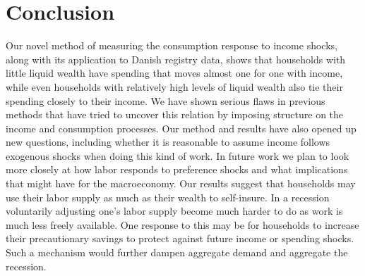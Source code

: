 \documentclass[titlepage]{\econtex}\newcommand{\texname}{IncomeUncertainty}
\begin{document}
\section{Conclusion}
Our novel method of measuring the consumption response to income shocks, along with its application to Danish registry data, shows that households with little liquid wealth have spending that moves almost one for one with income, while even households with relatively high levels of liquid wealth also tie their spending closely to their income. We have shown serious flaws in previous methods that have tried to uncover this relation by imposing structure on the income and consumption processes. Our method and results have also opened up new questions, including whether it is reasonable to assume income follows exogenous shocks when doing this kind of work. In future work we plan to look more closely at how labor responds to preference shocks and what implications that might have for the macroeconomy. Our results suggest that households may use their labor supply as much as their wealth to self-insure. In a recession voluntarily adjusting one's labor supply become much harder to do as work is much less freely available. One response to this may be for households to increase their precautionary savings to protect against future income or spending shocks. Such a mechanism would further dampen aggregate demand and aggregate the recession.


\processdelayedfloats

\small

\normalsize
\end{document}
